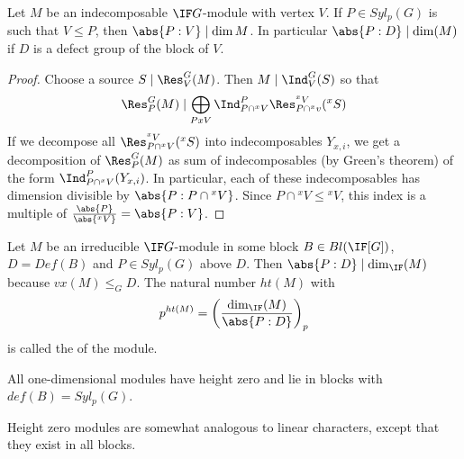 \begin{theorem}
Let $M$ be an indecomposable $\IF G$-module with vertex $V$. If $P\in Syl_p(G)$ is such that $V\leq P$, then $\abs{P:V} \mid \dim M$. In particular $\abs{P:D} \mid \dim(M)$ if $D$ is a defect group of the block of $V$.
\end{theorem}
\begin{proof}
Choose a source $S \mid \Res_V^G(M)$. Then $M \mid \Ind_V^G(S)$ so that 
\[\Res_P^G(M) \mid \bigoplus_{PxV} \Ind_{P\cap{^x V}}^P \Res_{P\cap{^x v}}^{^x V}(^x S)\]
If we decompose all $\Res_{P\cap{^x V}}^{^x V}(^x S)$ into indecomposables $Y_{x,i}$, we get a decomposition of $\Res_P^G(M)$ as sum of indecomposables (by Green's theorem) of the form $\Ind_{P\cap{^x V}}^P(Y_{x,i})$. In particular, each of these indecomposables has dimension divisible by $\abs{P:P\cap{^x V}}$. Since $P\cap{^x V} \leq {^x V}$, this index is a multiple of $\frac{\abs{P}}{\abs{^x V}}=\abs{P:V}$.
\end{proof}

\begin{definition}
Let $M$ be an irreducible $\IF G$-module in some block $B\in Bl(\IF[G])$, $D=Def(B)$ and $P\in Syl_p(G)$ above $D$. Then $\abs{P:D} \mid \dim_\IF(M)$ because $vx(M)\leq_G D$. The natural number $ht(M)$ with
\[p^{ht(M)} = \left(\frac{\dim_\IF(M)}{\abs{P:D}}\right)_p\]
is called the  of the module.
\end{definition}

\begin{corollary}
All one-dimensional modules have height zero and lie in blocks with $def(B)=Syl_p(G)$.
\end{corollary}

\begin{remark}
Height zero modules are somewhat analogous to linear characters, except that they exist in all blocks.
\end{remark}

